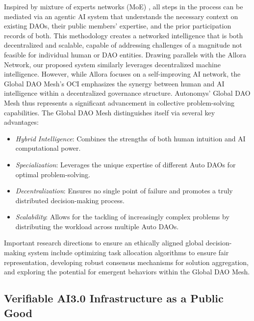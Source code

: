 \documentclass[conference]{IEEEtran}
\begin{document}
Inspired by mixture of experts networks (MoE) \cite{moe}, all steps in the process can be mediated via an agentic AI system that understands the necessary context on existing DAOs, their public members' expertise, and the prior participation records of both. This methodology creates a networked intelligence that is both decentralized and scalable, capable of addressing challenges of a magnitude not feasible for individual human or DAO entities. Drawing parallels with the Allora Network\cite{allora}, our proposed system similarly leverages decentralized machine intelligence. However, while Allora focuses on a self-improving AI network, the Global DAO Mesh's OCI emphasizes the synergy between human and AI intelligence within a decentralized governance structure. Autonomys' Global DAO Mesh thus represents a significant advancement in collective problem-solving capabilities. The Global DAO Mesh distinguishes itself via several key advantages:
\begin{itemize}
    \item \textit{Hybrid Intelligence}: Combines the strengths of both human intuition and AI computational power.
    \item \textit{Specialization}: Leverages the unique expertise of different Auto DAOs for optimal problem-solving.
    \item \textit{Decentralization}: Ensures no single point of failure and promotes a truly distributed decision-making process.
    \item \textit{Scalability}: Allows for the tackling of increasingly complex problems by distributing the workload across multiple Auto DAOs.
\end{itemize}

Important research directions to ensure an ethically aligned global decision-making system include optimizing task allocation algorithms to ensure fair representation, developing robust consensus mechanisms for solution aggregation, and exploring the potential for emergent behaviors within the Global DAO Mesh.


\subsection{Verifiable AI3.0 Infrastructure as a Public Good}
\end{document}
